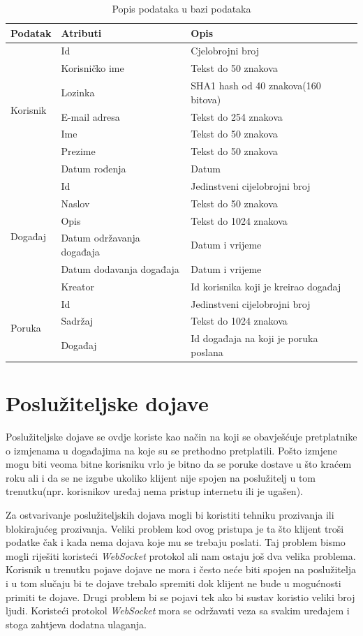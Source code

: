 \documentclass[times, utf8, zavrsni]{fer}
\begin{document}
{\begin{table}[htb]
\caption{Popis podataka u bazi podataka}
\label{tbl:database}
\centering
\begin{tabular}{lll} \hline
Podatak & Atributi & Opis\\ \hline
\multirow{7}{*}{Korisnik}
& Id & Cjelobrojni broj \\
& Korisničko ime & Tekst do 50 znakova \\
& Lozinka & SHA1 hash od 40 znakova(160 bitova) \\
& E-mail adresa & Tekst do 254 znakova \\
& Ime & Tekst do 50 znakova \\
& Prezime & Tekst do 50 znakova \\
& Datum rođenja & Datum \\ \hline
\multirow{6}{*}{Događaj}
& Id & Jedinstveni cijelobrojni broj \\
& Naslov & Tekst do 50 znakova \\
& Opis & Tekst do 1024 znakova \\
& Datum održavanja događaja & Datum i vrijeme \\
& Datum dodavanja događaja & Datum i vrijeme \\ 
& Kreator & Id korisnika koji je kreirao događaj \\ \hline
\multirow{3}{*}{Poruka}
& Id & Jedinstveni cijelobrojni broj \\
& Sadržaj & Tekst do 1024 znakova \\
& Događaj & Id događaja na koji je poruka poslana \\ \hline
\end{tabular}
\end{table}

\section{Poslužiteljske dojave}
Poslužiteljske dojave se ovdje koriste kao način na koji se obavješćuje pretplatnike o izmjenama u događajima na koje su se prethodno pretplatili. Pošto izmjene mogu biti veoma bitne korisniku vrlo je bitno da se poruke dostave u što kraćem roku ali i da se ne izgube ukoliko klijent nije spojen na poslužitelj u tom trenutku(npr. korisnikov uređaj nema pristup internetu ili je ugašen).

Za ostvarivanje poslužiteljskih dojava mogli bi koristiti tehniku prozivanja ili blokirajućeg prozivanja. Veliki problem kod ovog pristupa je ta što klijent troši podatke čak i kada nema dojava koje mu se trebaju poslati. Taj problem bismo mogli riješiti koristeći {\em WebSocket} protokol ali nam ostaju još dva velika problema. Korisnik u trenutku pojave dojave ne mora i često neće biti spojen na poslužitelja i u tom slučaju bi te dojave trebalo spremiti dok klijent ne bude u mogućnosti primiti te dojave. Drugi problem bi se pojavi tek ako bi sustav koristio veliki broj ljudi. Koristeći protokol {\em WebSocket} mora se održavati veza sa svakim uređajem i stoga zahtjeva dodatna ulaganja.

}
\end{document}
